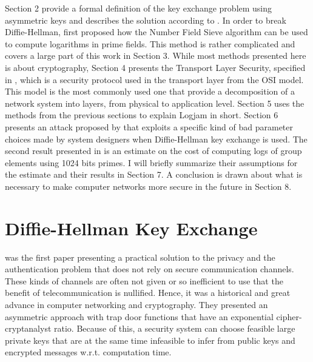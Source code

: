 \documentclass[paper=a4, fontsize=11pt]{scrartcl} %
\numberwithin{equation}{section} %
\numberwithin{figure}{section} %
\numberwithin{table}{section} %
\begin{document}
Section 2 provide a formal definition of the key exchange problem using asymmetric keys and describes the solution according to \citep{diffie1976new}. In order to break Diffie-Hellman, \citep{gordon1993discrete} first proposed how the Number Field Sieve algorithm can be used to compute logarithms in prime fields. This method is rather complicated and covers a large part of this work in Section 3. While most methods presented here is about cryptography, Section 4 presents the Transport Layer Security, specified in \citep{dierks2008transport}, which is a security protocol used in the transport layer from the OSI model. This model is the most commonly used one that provide a decomposition of a network system into layers, from physical to application level. Section 5 uses the methods from the previous sections to explain Logjam in short. Section 6 presents an attack proposed by \citep{van1996diffie} that exploits a specific kind of bad parameter choices made by system designers when Diffie-Hellman key exchange is used. The second result presented in \citep{Adrian:2015:IFS:2810103.2813707} is an estimate on the cost of computing logs of group elements using 1024 bits primes. I will briefly summarize their assumptions for the estimate and their results in Section 7. A conclusion is drawn about what is necessary to make computer networks more secure in the future in Section 8.
\section{Diffie-Hellman Key Exchange}
\label{sec:DHKeyExchange}
\citep{diffie1976new} was the first paper presenting a practical solution to the privacy and the authentication problem that does not rely on secure communication channels. These kinds of channels are often not given or so inefficient to use that the benefit of telecommunication is nullified. Hence, it was a historical and great advance in computer networking and cryptography. They presented an asymmetric approach with trap door functions that have an exponential cipher-cryptanalyst ratio. Because of this, a security system can choose feasible large private keys that are at the same time infeasible to infer from public keys and encrypted messages w.r.t. computation time.
\end{document}
